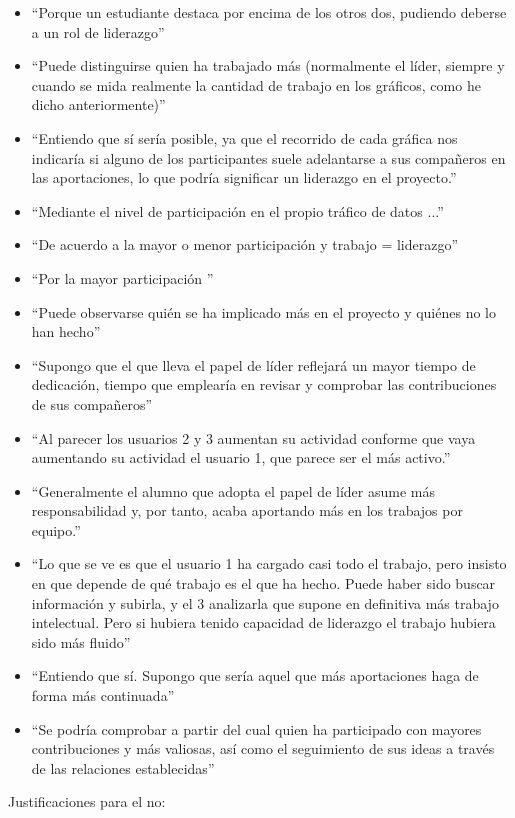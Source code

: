 \begin{itemize}
\item ``Porque un estudiante destaca por encima de los otros dos, pudiendo deberse a un rol de liderazgo''
\item ``Puede distinguirse quien ha trabajado más (normalmente el líder, siempre y cuando se mida realmente la cantidad de trabajo en los gráficos, como he dicho anteriormente)''
\item ``Entiendo que sí sería posible, ya que el recorrido de cada gráfica nos indicaría si alguno de los participantes suele adelantarse a sus compañeros en las aportaciones, lo que podría significar un liderazgo en el proyecto.''
\item ``Mediante el nivel de participación en el propio tráfico de datos ...''
\item ``De acuerdo a la mayor o menor participación y trabajo = liderazgo''
\item ``Por la mayor participación ''
\item ``Puede observarse quién se ha implicado más en el proyecto y quiénes no lo han hecho''
\item ``Supongo que el que lleva el papel de líder reflejará un mayor tiempo de dedicación, tiempo que emplearía en revisar y comprobar las contribuciones de sus compañeros''
\item ``Al parecer los usuarios 2 y 3 aumentan su actividad conforme que vaya aumentando su actividad el usuario 1, que parece ser el más activo.''
\item ``Generalmente el alumno que adopta el papel de líder asume más responsabilidad y, por tanto, acaba aportando más en los trabajos por equipo.''
\item ``Lo que se ve es que el usuario 1 ha cargado casi todo el trabajo, pero insisto en que depende de qué trabajo es el que ha hecho. Puede haber sido buscar información y subirla, y el 3 analizarla que supone en definitiva más trabajo intelectual. Pero si hubiera tenido capacidad de liderazgo el trabajo hubiera sido más fluido''
\item ``Entiendo que sí. Supongo que sería aquel que más aportaciones haga de forma más continuada''
\item ``Se podría comprobar a partir del cual  quien ha participado con mayores contribuciones y más valiosas, así como el seguimiento de sus ideas a través de las relaciones establecidas''
\end{itemize}

Justificaciones para el no:

